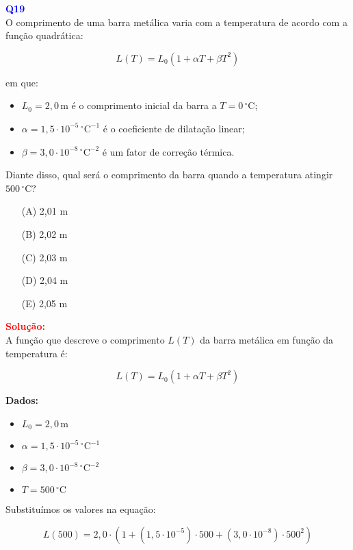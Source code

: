 \documentclass[a4paper,12pt]{article}
\begin{document}
\begin{flushleft}
\textbf{\textcolor{blue}{\Large Q19}}\\
O comprimento de uma barra metálica varia com a temperatura de acordo com a função quadrática:

\[
L(T) = L_0 (1 + \alpha T + \beta T^2)
\]

em que:

\begin{itemize}
  \item \(L_0 = 2{,}0\,\text{m}\) é o comprimento inicial da barra a \(T = 0\,^\circ\text{C}\);
  \item \(\alpha = 1{,}5 \cdot 10^{-5}\,^\circ\text{C}^{-1}\) é o coeficiente de dilatação linear;
  \item \(\beta = 3{,}0 \cdot 10^{-8}\,^\circ\text{C}^{-2}\) é um fator de correção térmica.
\end{itemize}

Diante disso, qual será o comprimento da barra quando a temperatura atingir \(500\,^\circ\text{C}\)?


\begin{itemize}
\item[(A)] 2,01 m
\item[(B)] 2,02 m
\item[(C)] 2,03 m
\item[(D)] 2,04 m
\item[(E)] 2,05 m
\end{itemize}

\vspace{0.5cm}

\textcolor{red}{\textbf{Solução:}}\\

A função que descreve o comprimento \(L(T)\) da barra metálica em função da temperatura é:

\[
L(T) = L_0 (1 + \alpha T + \beta T^2)
\]

\textbf{Dados:}
\begin{itemize}
  \item \(L_0 = 2{,}0\,\text{m}\)
  \item \(\alpha = 1{,}5 \cdot 10^{-5}\,^\circ\text{C}^{-1}\)
  \item \(\beta = 3{,}0 \cdot 10^{-8}\,^\circ\text{C}^{-2}\)
  \item \(T = 500\,^\circ\text{C}\)
\end{itemize}

Substituímos os valores na equação:

\[
L(500) = 2{,}0 \cdot \left(1 + (1{,}5 \cdot 10^{-5}) \cdot 500 + (3{,}0 \cdot 10^{-8}) \cdot 500^2 \right)
\]


\end{flushleft}
\end{document}
